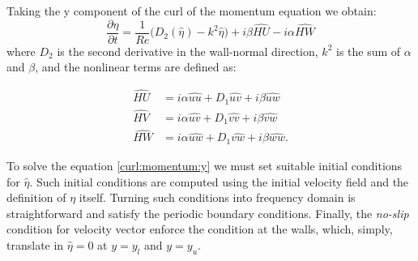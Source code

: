 Taking the y component of the curl of the momentum equation we obtain:
\begin{equation}
\label{curl:momentum:y}
\frac{\partial \hat{\eta}}{\partial t}  = \frac{1}{Re}  \big( D_{2}(\hat{\eta}) - k^{2} \hat{\eta} \big) + i \beta \widehat{HU} -i \alpha \widehat{HW}
\end{equation}
where $D_{2}$ is the second derivative in the wall-normal direction, $k^{2}$ is the sum of $\alpha$ and $\beta$, and the nonlinear terms are defined as:

\begin{subequations}
\label{nonlinear:terms}
\begin{align}
\widehat{HU} &= i \alpha \widehat{uu} + D_{1} \widehat{uv} + i \beta \widehat{uw}\\ 
\widehat{HV} &= i \alpha \widehat{uv} + D_{1} \widehat{vv} + i \beta \widehat{vw}\\
\widehat{HW} &= i \alpha \widehat{uw} + D_{1} \widehat{vw} + i \beta \widehat{ww}.
\end{align}
\end{subequations}

To solve the equation \eqref{curl:momentum:y} we must set suitable initial conditions for $\hat{\eta}$. Such initial conditions are computed using the initial velocity field and the definition of $\eta$ itself.
Turning such conditions into frequency domain is straightforward and satisfy the periodic boundary conditions. Finally, the \emph{no-slip} condition for velocity vector enforce the condition at the walls, which, simply, translate in $\hat{\eta}=0$ at $y=y_{l}$ and $y=y_{u}$.


